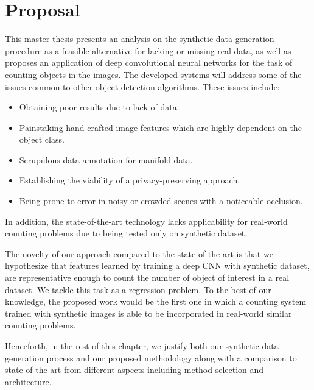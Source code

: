 \newpage
\chapter{Proposal}
\label{sec:proposal}
\noindent

This master thesis presents an analysis on the synthetic data generation procedure as a feasible alternative for lacking or missing real data, as well as proposes an application of deep convolutional neural networks for the task of counting objects in the images. The developed systems will address some of the issues common to other object detection algorithms. These issues include: 

\begin{itemize}
	
	\item Obtaining poor results due to lack of data. 
	\item Painstaking hand-crafted image features which are highly dependent on the object class. 
	\item Scrupulous data annotation for manifold data. 
	\item Establishing the viability of a privacy-preserving approach. 
	\item Being prone to error in noisy or crowded scenes with a noticeable occlusion. 

\end{itemize} 
In addition, the state-of-the-art \cite{segui2015learning} technology lacks applicability for real-world counting problems due to being tested only on synthetic dataset.

The novelty of our approach compared to the state-of-the-art is that we hypothesize that features learned by training a  deep CNN with synthetic dataset, are representative enough to count the number of object of interest in a real dataset. We tackle this task as a regression problem. 
To the best of our knowledge, the proposed work would be the first one in which a counting system trained with synthetic images is able to be incorporated in real-world similar counting problems.

Henceforth, in the rest of this chapter, we justify both our synthetic data generation process and our proposed methodology along with a comparison to state-of-the-art from different aspects including method selection and architecture.   


